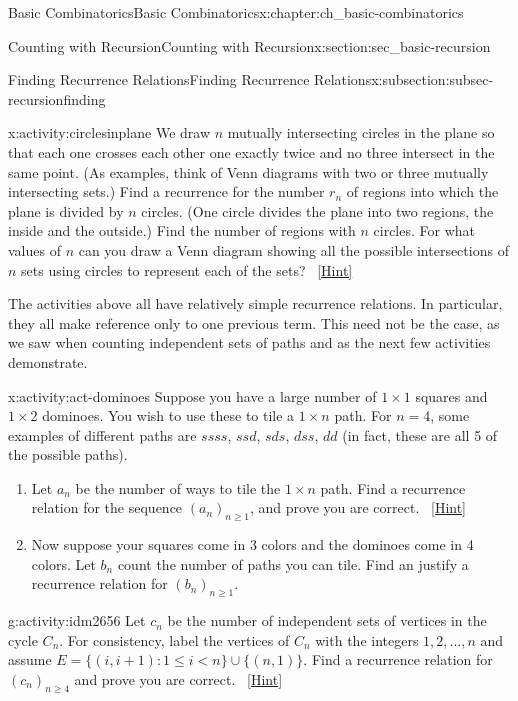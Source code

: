 \documentclass[oneside,10pt,]{book}
\numberwithin{equation}{chapter}
\def\st{:}
\newcommand{\lt}{<}
\begin{document}
\begin{chapterptx}{Basic Combinatorics}{}{Basic Combinatorics}{}{}{x:chapter:ch_basic-combinatorics}
\begin{sectionptx}{Counting with Recursion}{}{Counting with Recursion}{}{}{x:section:sec_basic-recursion}
\begin{subsectionptx}{Finding Recurrence Relations}{}{Finding Recurrence Relations}{}{}{x:subsection:subsec-recursionfinding}
\begin{activity}{}{x:activity:circlesinplane}%
We draw \(n\) mutually intersecting circles in the plane so that each one crosses each other one exactly twice and no three intersect in the same point. (As examples, think of Venn diagrams with two or three mutually intersecting sets.) Find a recurrence for the number \(r_n\) of regions into which the plane is divided by \(n\) circles. (One circle divides the plane into two regions, the inside and the outside.) Find the number of regions with \(n\) circles. For what values of \(n\) can you draw a Venn diagram showing all the possible intersections of \(n\) sets using circles to represent each of the sets?%
\qquad~\hfill{\tiny\hyperlink{g:hint:idm2589-back}{[Hint]}}\end{activity}
The activities above all have relatively simple recurrence relations.  In particular, they all make reference only to one previous term.  This need not be the case, as we saw when counting independent sets of paths and as the next few activities demonstrate.%
\begin{activity}{}{x:activity:act-dominoes}%
Suppose you have a large number of \(1\times 1\) squares and \(1 \times 2\) dominoes.  You wish to use these to tile a \(1 \times n\) path.  For \(n = 4\), some examples of different paths are \(ssss\), \(ssd\), \(sds\), \(dss\), \(dd\) (in fact, these are all 5 of the possible paths).%
\begin{enumerate}[font=\bfseries,label=(\alph*),ref=\alph*]
\item{}Let \(a_n\) be the number of ways to tile the \(1 \times n\) path.  Find a recurrence relation for the sequence \((a_n)_{n \ge 1}\), and prove you are correct.%
\qquad~\hfill{\tiny\hyperlink{g:hint:idm2648-back}{[Hint]}}\item{}Now suppose your squares come in 3 colors and the dominoes come in 4 colors.  Let \(b_n\) count the number of paths you can tile.  Find an justify a recurrence relation for \((b_n)_{n \ge 1}\).%
\end{enumerate}
\end{activity}
\begin{activity}{}{g:activity:idm2656}%
Let \(c_n\) be the number of independent sets of vertices in the cycle \(C_n\).  For consistency, label the vertices of \(C_n\) with the integers \(1, 2, \ldots, n\) and assume \(E = \{(i, i+1) \st 1 \le i \lt n\} \cup \{(n, 1)\}\). Find a recurrence relation for \((c_n)_{n\ge 4}\) and prove you are correct.%
\qquad~\hfill{\tiny\hyperlink{g:hint:idm2665-back}{[Hint]}}\end{activity}

\end{subsectionptx}
\end{sectionptx}
\end{chapterptx}
\end{document}
